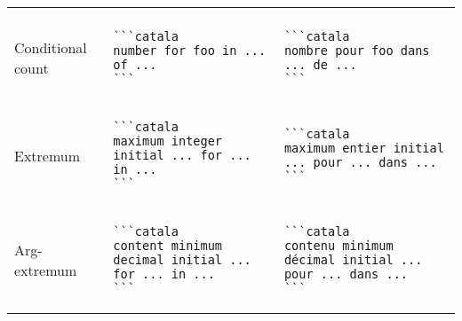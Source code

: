 \documentclass[a3paper,landscape]{article}
\begin{document}
\begin{multicols*}{2}
\begin{center}
\begin{tabular}{p{}p{}p{}}
\vspace*{-1.75em}
\\
Conditional count&
\vspace*{-1.75em}
\begin{verbatim}
```catala
number for foo in ... of ...
```
\end{verbatim}
\vspace*{-1.75em}
&
\vspace*{-1.75em}
\begin{verbatim}
```catala
nombre pour foo dans ... de ...
```
\end{verbatim}
\vspace*{-1.75em}
\\
Extremum&
\vspace*{-1.75em}
\begin{verbatim}
```catala
maximum integer initial ... for ... in ...
```
\end{verbatim}
\vspace*{-1.75em}
&
\vspace*{-1.75em}
\begin{verbatim}
```catala
maximum entier initial ... pour ... dans ...
```
\end{verbatim}
\vspace*{-1.75em}
\\
Arg-extremum&
\vspace*{-1.75em}
\begin{verbatim}
```catala
content minimum decimal initial ... for ... in ...
```
\end{verbatim}
\vspace*{-1.75em}
&
\vspace*{-1.75em}
\begin{verbatim}
```catala
contenu minimum décimal initial ... pour ... dans ...
```
\end{verbatim}
\vspace*{-1.75em}
\\
\bottomrule
\end{tabular}
\end{center}



\end{multicols*}
\end{document}
